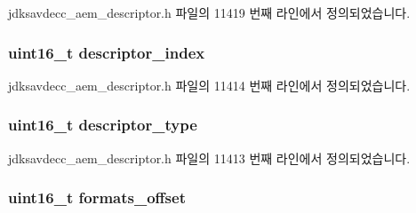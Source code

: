 jdksavdecc\+\_\+aem\+\_\+descriptor.\+h 파일의 11419 번째 라인에서 정의되었습니다.

\subsubsection[{\texorpdfstring{descriptor\+\_\+index}{descriptor_index}}]{\setlength{\rightskip}{0pt plus 5cm}uint16\+\_\+t descriptor\+\_\+index}\hypertarget{structjdksavdecc__descriptor__stream_a042bbc76d835b82d27c1932431ee38d4}{}\label{structjdksavdecc__descriptor__stream_a042bbc76d835b82d27c1932431ee38d4}


jdksavdecc\+\_\+aem\+\_\+descriptor.\+h 파일의 11414 번째 라인에서 정의되었습니다.

\subsubsection[{\texorpdfstring{descriptor\+\_\+type}{descriptor_type}}]{\setlength{\rightskip}{0pt plus 5cm}uint16\+\_\+t descriptor\+\_\+type}\hypertarget{structjdksavdecc__descriptor__stream_ab7c32b6c7131c13d4ea3b7ee2f09b78d}{}\label{structjdksavdecc__descriptor__stream_ab7c32b6c7131c13d4ea3b7ee2f09b78d}


jdksavdecc\+\_\+aem\+\_\+descriptor.\+h 파일의 11413 번째 라인에서 정의되었습니다.

\subsubsection[{\texorpdfstring{formats\+\_\+offset}{formats_offset}}]{\setlength{\rightskip}{0pt plus 5cm}uint16\+\_\+t formats\+\_\+offset}\hypertarget{structjdksavdecc__descriptor__stream_a14de2c30220ecf623bb08204c1c90e61}{}\label{structjdksavdecc__descriptor__stream_a14de2c30220ecf623bb08204c1c90e61}



